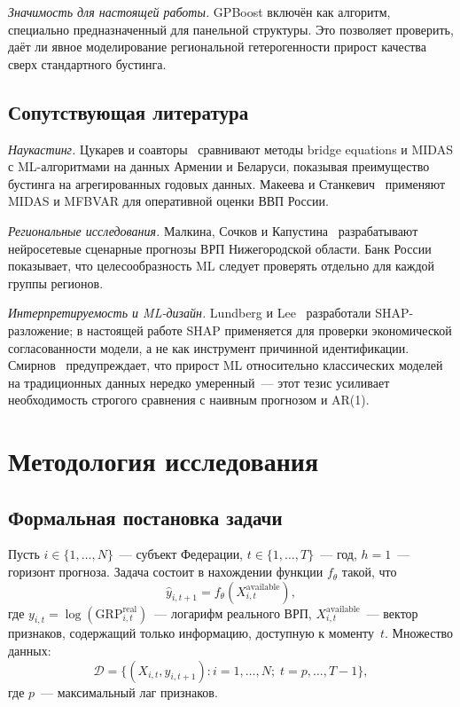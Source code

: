 \documentclass[12pt,a4paper]{article}
\begin{document}
\textit{Значимость для настоящей работы.} GPBoost включён как алгоритм,
специально предназначенный для панельной структуры. Это позволяет проверить,
даёт ли явное моделирование региональной гетерогенности прирост качества
сверх стандартного бустинга.

\subsection{Сопутствующая литература}

\textit{Наукастинг.} Цукарев и соавторы~\cite{tsukarev2025} сравнивают
методы bridge equations и MIDAS с ML-алгоритмами на данных Армении
и Беларуси, показывая преимущество бустинга на агрегированных годовых данных.
Макеева и Станкевич~\cite{makeeva2022} применяют MIDAS и MFBVAR для
оперативной оценки ВВП России.

\textit{Региональные исследования.} Малкина, Сочков и Капустина~\cite{malkina2025}
разрабатывают нейросетевые сценарные прогнозы ВРП Нижегородской области.
Банк России~\cite{semiturkin2022} показывает, что целесообразность ML
следует проверять отдельно для каждой группы регионов.

\textit{Интерпретируемость и ML-дизайн.} Lundberg и Lee~\cite{lundberg2017}
разработали SHAP-разложение; в настоящей работе SHAP применяется для
проверки экономической согласованности модели, а не как инструмент
причинной идентификации. Смирнов~\cite{smirnov2025} предупреждает, что
прирост ML относительно классических моделей на традиционных данных
нередко умеренный~--- этот тезис усиливает необходимость строгого сравнения
с наивным прогнозом и AR(1).

\section{Методология исследования}

\subsection{Формальная постановка задачи}

Пусть $i \in \{1,\ldots,N\}$~--- субъект Федерации, $t \in \{1,\ldots,T\}$~---
год, $h=1$~--- горизонт прогноза. Задача состоит в нахождении функции
$f_\theta$ такой, что
\begin{equation}
  \hat{y}_{i,t+1} = f_\theta(X^{\text{available}}_{i,t}),
\end{equation}
где $y_{i,t} = \log(\mathrm{GRP}^{\text{real}}_{i,t})$~--- логарифм реального
ВРП, $X^{\text{available}}_{i,t}$~--- вектор признаков, содержащий только
информацию, доступную к моменту~$t$. Множество данных:
\begin{equation}
  \mathcal{D} = \{(X_{i,t}, y_{i,t+1}) : i = 1,\ldots,N;\; t = p,\ldots,T-1\},
\end{equation}
где $p$~--- максимальный лаг признаков.
\end{document}
